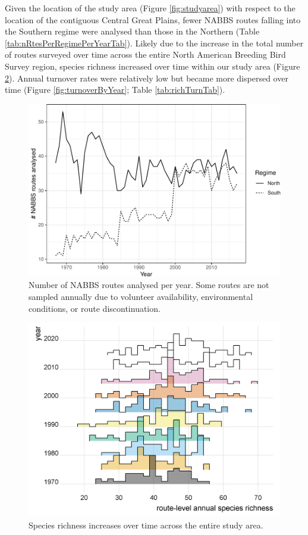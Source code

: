 \documentclass[print]{nuthesis}
\begin{document}
Given the location of the study area (Figure \ref{fig:studyarea}) with respect to the location of the contiguous Central Great Plains, fewer NABBS routes falling into the Southern regime were analysed than those in the Northern (Table \ref{tab:nRtesPerRegimePerYearTab}). Likely due to the increase in the total number of routes surveyed over time across the entire North American Breeding Bird Survey region, species richness increased over time within our study area (Figure \ref{fig:richnessByYear}). Annual turnover rates were relatively low but became more dispersed over time (Figure \ref{fig:turnoverByYear}; Table \ref{tab:richTurnTab}).
\begin{figure}
\includegraphics[width=0.85\linewidth]{_myDissertation_files/figure-latex/nRtesPerRegimePerYearFig-1} \caption{Number of NABBS routes analysed per year. Some routes are not sampled annually due to volunteer availability, environmental conditions, or route discontinuation.}\label{fig:nRtesPerRegimePerYearFig}
\end{figure}
\begin{figure}
\includegraphics[width=0.85\linewidth]{.//chapterFiles/discontinuityAnalysis/figsCalledInDiss/richnessByYear} \caption{Species richness increases over time across the entire study area.}\label{fig:richnessByYear}
\end{figure}
\end{document}
